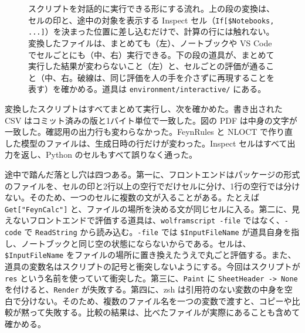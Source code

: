 \documentclass[a4paper,10pt]{ltjsarticle}
\newcommand{\bq}{\textasciigrave}
\begin{document}
\begin{figure}[tbp]
\caption{スクリプトを対話的に実行できる形にする流れ。上の段の変換は、セルの印と、途中の対象を表示する Inspect セル（\texttt{If[\$Notebooks, ...]}）を決まった位置に差し込むだけで、計算の行には触れない。変換したファイルは、まとめても（左）、ノートブックや VS Code でセルごとにも（中、右）実行できる。下の段の道具が、まとめて実行した結果が変わらないこと（左）と、セルごとの評価が通ること（中、右。破線は、同じ評価を人の手を介さずに再現することを表す）を確かめる。道具は \nolinkurl{environment/interactive/} にある。}
\label{fig:interactive}
\end{figure}
変換したスクリプトはすべてまとめて実行し、次を確かめた。書き出された CSV はコミット済みの版と1バイト単位で一致した。図の PDF は中身の文字が一致した。確認用の出力行も変わらなかった。FeynRules と NLOCT で作り直した模型のファイルは、生成日時の行だけが変わった。Inspect セルはすべて出力を返し、Python のセルもすべて誤りなく通った。

途中で踏んだ落とし穴は四つある。第一に、フロントエンドはパッケージの形式のファイルを、セルの印と2行以上の空行でだけセルに分け、1行の空行では分けない。そのため、一つのセルに複数の文が入ることがある。たとえば \texttt{Get["FeynCalc\bq"]} と、ファイルの場所を決める文が同じセルに入る。第二に、見えないフロントエンドで評価する道具は、\texttt{wolframscript -file} ではなく、\texttt{-code} で \texttt{ReadString} から読み込む。\texttt{-file} では \texttt{\$InputFileName} が道具自身を指し、ノートブックと同じ空の状態にならないからである。セルは、\texttt{\$InputFileName} をファイルの場所に置き換えたうえで丸ごと評価する。また、道具の変数名はスクリプトの記号と衝突しないようにする。今回はスクリプトが \texttt{res} という名前を使っていて衝突した。第三に、\texttt{Paint} に \texttt{SheetHeader -> None} を付けると、\texttt{Render} が失敗する。第四に、zsh は引用符のない変数の中身を空白で分けない。そのため、複数のファイル名を一つの変数で渡すと、コピーや比較が黙って失敗する。比較の結果は、比べたファイルが実際にあることも含めて確かめる。
\end{document}
